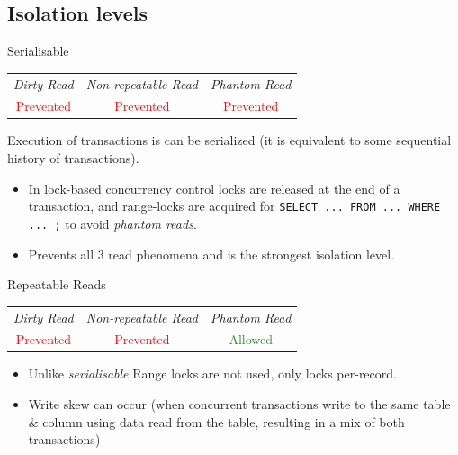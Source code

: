 \subsection{Isolation levels}
\begin{definitionbox}{Serialisable}
    \begin{center}
        \begin{tabular}{c | c | c}
            \textit{Dirty Read}        & \textit{Non-repeatable Read} & \textit{{Phantom Read}}    \\
            \textcolor{red}{Prevented} & \textcolor{red}{Prevented}   & \textcolor{red}{Prevented} \\
        \end{tabular}
    \end{center}
    Execution of transactions is can be serialized (it is equivalent to some sequential history of transactions).
    \begin{itemize}
        \item In lock-based concurrency control locks are released at the end of a transaction, and range-locks are acquired for \texttt{SELECT ... FROM ... WHERE ... ;} to avoid \textit{phantom reads}.
        \item Prevents all 3 read phenomena and is the strongest isolation level.
    \end{itemize}
\end{definitionbox}
\begin{definitionbox}{Repeatable Reads}
    \begin{center}
        \begin{tabular}{c | c | c}
            \textit{Dirty Read}        & \textit{Non-repeatable Read} & \textit{{Phantom Read}}          \\
            \textcolor{red}{Prevented} & \textcolor{red}{Prevented}   & \textcolor{ForestGreen}{Allowed} \\
        \end{tabular}
    \end{center}
    \begin{itemize}
        \item Unlike \textit{serialisable} Range locks are not used, only locks per-record.
        \item Write skew can occur (when concurrent transactions write to the same table \& column using data read from the table, resulting in a mix of both transactions)
    \end{itemize}
\end{definitionbox}
